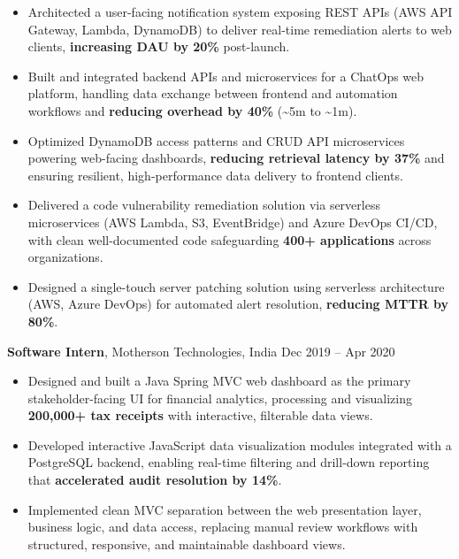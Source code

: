 \documentclass[letterpaper,10.5pt]{extarticle}
\begin{document}
\begin{itemize}[leftmargin=12pt, topsep=1pt, itemsep=0pt, parsep=0pt]
    \item Architected a user-facing notification system exposing REST APIs (AWS API Gateway, Lambda, DynamoDB) to deliver real-time remediation alerts to web clients, \textbf{increasing DAU by 20\%} post-launch.
    \item Built and integrated backend APIs and microservices for a ChatOps web platform, handling data exchange between frontend and automation workflows and \textbf{reducing overhead by 40\%} (\textasciitilde5m to \textasciitilde1m).
    \item Optimized DynamoDB access patterns and CRUD API microservices powering web-facing dashboards, \textbf{reducing retrieval latency by 37\%} and ensuring resilient, high-performance data delivery to frontend clients.
    \item Delivered a code vulnerability remediation solution via serverless microservices (AWS Lambda, S3, EventBridge) and Azure DevOps CI/CD, with clean well-documented code safeguarding \textbf{400+ applications} across organizations.
    \item Designed a single-touch server patching solution using serverless architecture (AWS, Azure DevOps) for automated alert resolution, \textbf{reducing MTTR by 80\%}.
\end{itemize}

\vspace{4pt}

\noindent\textbf{Software Intern}, Motherson Technologies, India \hfill Dec 2019 -- Apr 2020

\begin{itemize}[leftmargin=12pt, topsep=1pt, itemsep=0pt, parsep=0pt]
    \item Designed and built a Java Spring MVC web dashboard as the primary stakeholder-facing UI for financial analytics, processing and visualizing \textbf{200,000+ tax receipts} with interactive, filterable data views.
    \item Developed interactive JavaScript data visualization modules integrated with a PostgreSQL backend, enabling real-time filtering and drill-down reporting that \textbf{accelerated audit resolution by 14\%}.
    \item Implemented clean MVC separation between the web presentation layer, business logic, and data access, replacing manual review workflows with structured, responsive, and maintainable dashboard views.
\end{itemize}
\end{document}
